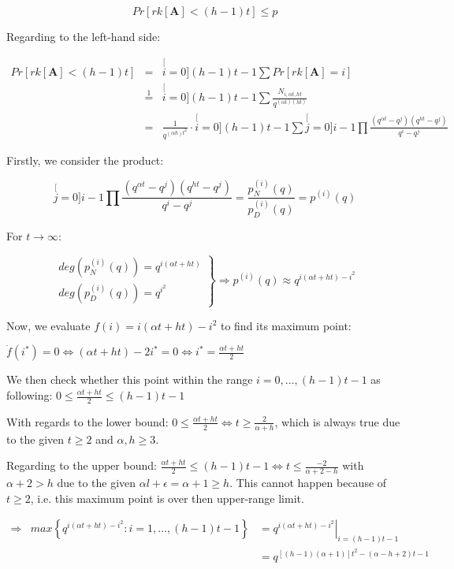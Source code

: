 \[
Pr\left[rk\left[\boldsymbol{A}\right]<(h-1)t\right]\leq p
\]

Regarding to the left-hand side:

\begin{eqnarray}
Pr\left[rk\left[\boldsymbol{A}\right]<(h-1)t\right] & = & \stackrel[i=0]{(h-1)t-1}{\mathop{\sum}}Pr\left[rk\left[\boldsymbol{A}\right]=i\right]\nonumber \\
 & \overset{1}{=} & \stackrel[i=0]{(h-1)t-1}{\mathop{\sum}}\frac{N_{i,\alpha t,ht}}{q^{\left(\alpha t\right)\left(ht\right)}}\nonumber \\
 & = & \frac{1}{q^{\left(\alpha h\right)t^{2}}}\cdot\stackrel[i=0]{(h-1)t-1}{\mathop{\sum}}\stackrel[j=0]{i-1}{\mathop{\prod}}\frac{\left(q^{\alpha t}-q^{j}\right)\left(q^{ht}-q^{j}\right)}{q^{i}-q^{j}}\label{eq:general_nw_calc_p}
\end{eqnarray}

Firstly, we consider the product:

\[
\stackrel[j=0]{i-1}{\mathop{\prod}}\frac{\left(q^{\alpha t}-q^{j}\right)\left(q^{ht}-q^{j}\right)}{q^{i}-q^{j}}=\frac{p_{N}^{(i)}(q)}{p_{D}^{(i)}(q)}=p^{(i)}(q)
\]

For $t\rightarrow\infty$:

\[
\left.\begin{array}{c}
deg\left(p_{N}^{(i)}(q)\right)=q^{i(\alpha t+ht)}\\
deg\left(p_{D}^{(i)}(q)\right)=q^{i^{2}}
\end{array}\right\} \Rightarrow p^{(i)}(q)\approx q^{i(\alpha t+ht)-i^{2}}
\]

Now, we evaluate $f(i)=i(\alpha t+ht)-i^{2}$ to find its maximum
point:

$\dot{f}(i^{*})=0\Leftrightarrow(\alpha t+ht)-2i^{*}=0\Leftrightarrow i^{*}=\frac{\alpha t+ht}{2}$

We then check whether this point within the range $i=0,\ldots,(h-1)t-1$
as following: $0\leq\frac{\alpha t+ht}{2}\leq(h-1)t-1$

With regards to the lower bound: $0\leq\frac{\alpha t+ht}{2}\Leftrightarrow t\geq\frac{2}{\alpha+h}$,
which is always true due to the given $t\geq2$ and $\alpha,h\geq3$.

Regarding to the upper bound: $\frac{\alpha t+ht}{2}\leq(h-1)t-1\Leftrightarrow t\leq\frac{-2}{\alpha+2-h}$
with $\alpha+2>h$ due to the given $\alpha l+\epsilon=\alpha+1\geq h$.
This cannot happen because of $t\geq2$, i.e. this maximum point is
over then upper-range limit.

\begin{eqnarray*}
\Rightarrow & max\left\{ q^{i(\alpha t+ht)-i^{2}}:i=1,\ldots,(h-1)t-1\right\}  & =\left.q^{i(\alpha t+ht)-i^{2}}\right|_{i=(h-1)t-1}\\
 &  & =q^{\left[\left(h-1\right)\left(\alpha+1\right)\right]t^{2}-\left(\alpha-h+2\right)t-1}
\end{eqnarray*}

